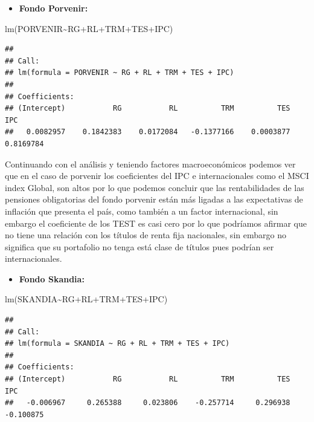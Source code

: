 \documentclass[
  12pt,
]{article}
\newenvironment{Shaded}{\begin{snugshade}}{\end{snugshade}}
\newcommand{\FunctionTok}[1]{\textcolor[rgb]{0.00,0.00,0.00}{#1}}
\newcommand{\NormalTok}[1]{#1}
\newcommand{\SpecialCharTok}[1]{\textcolor[rgb]{0.00,0.00,0.00}{#1}}
\providecommand{\tightlist}{%
  \setlength{\itemsep}{0pt}\setlength{\parskip}{0pt}}
\begin{document}
\begin{itemize}
\tightlist
\item
  \textbf{Fondo Porvenir:}
\end{itemize}

\begin{Shaded}
\begin{Highlighting}[]
\FunctionTok{lm}\NormalTok{(PORVENIR}\SpecialCharTok{\textasciitilde{}}\NormalTok{RG}\SpecialCharTok{+}\NormalTok{RL}\SpecialCharTok{+}\NormalTok{TRM}\SpecialCharTok{+}\NormalTok{TES}\SpecialCharTok{+}\NormalTok{IPC)}
\end{Highlighting}
\end{Shaded}

\begin{verbatim}
## 
## Call:
## lm(formula = PORVENIR ~ RG + RL + TRM + TES + IPC)
## 
## Coefficients:
## (Intercept)           RG           RL          TRM          TES          IPC  
##   0.0082957    0.1842383    0.0172084   -0.1377166    0.0003877    0.8169784
\end{verbatim}

Continuando con el análisis y teniendo factores macroeconómicos podemos
ver que en el caso de porvenir los coeficientes del IPC e
internacionales como el MSCI index Global, son altos por lo que podemos
concluir que las rentabilidades de las pensiones obligatorias del fondo
porvenir están más ligadas a las expectativas de inflación que presenta
el país, como también a un factor internacional, sin embargo el
coeficiente de los TEST es casi cero por lo que podríamos afirmar que no
tiene una relación con los títulos de renta fija nacionales, sin embargo
no significa que su portafolio no tenga está clase de títulos pues
podrían ser internacionales.

\begin{itemize}
\tightlist
\item
  \textbf{Fondo Skandia:}
\end{itemize}

\begin{Shaded}
\begin{Highlighting}[]
\FunctionTok{lm}\NormalTok{(SKANDIA}\SpecialCharTok{\textasciitilde{}}\NormalTok{RG}\SpecialCharTok{+}\NormalTok{RL}\SpecialCharTok{+}\NormalTok{TRM}\SpecialCharTok{+}\NormalTok{TES}\SpecialCharTok{+}\NormalTok{IPC)}
\end{Highlighting}
\end{Shaded}

\begin{verbatim}
## 
## Call:
## lm(formula = SKANDIA ~ RG + RL + TRM + TES + IPC)
## 
## Coefficients:
## (Intercept)           RG           RL          TRM          TES          IPC  
##   -0.006967     0.265388     0.023806    -0.257714     0.296938    -0.100875
\end{verbatim}
\end{document}
